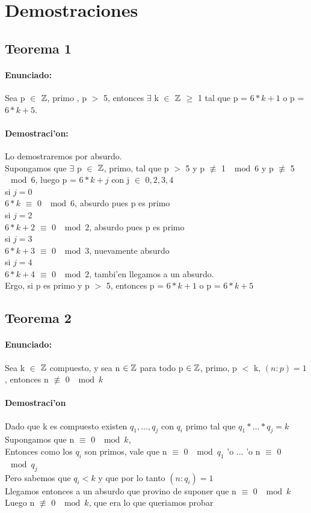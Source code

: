 \section{Demostraciones}
\subsection{Teorema 1}
\paragraph{Enunciado:}
Sea p $\in$ ${\mathbb Z}$, primo , p $>$ 5, entonces $\exists$ k $\in$ ${\mathbb Z}$ $\geq$ 1  tal que p = $6*k+1$ o p = $6*k +5$.
\paragraph{Demostraci'on:}
Lo demostraremos por absurdo.\\ Supongamos que $\exists$ p $\in$ ${\mathbb Z}$, primo, tal que p $>$ 5 y p $\not\equiv$ 1  $\mod{6}$ y p
$\not\equiv$ 5  $\mod{6}$, luego p = $6*k + j$ con j $\in$ ${0,2,3,4}$ \\
si $j = 0$\\
$6*k$ $\equiv$ 0  $\mod{6}$, absurdo pues p es primo\\
si $j = 2$\\
$6*k + 2$ $\equiv$ 0  $\mod{2}$, absurdo pues p es primo \\
si $j = 3$\\
$6*k + 3$ $\equiv$ 0  $\mod{3}$, nuevamente absurdo\\
si $j = 4$\\
$6*k + 4$ $\equiv$ 0  $\mod{2}$, tambi'en llegamos a un absurdo.\\
Ergo, si p es primo y p $>$ 5, entonces p = $6*k+1$ o p = $6*k +5$

\subsection{Teorema 2}
\paragraph{Enunciado:}
Sea k $\in$ ${\mathbb Z}$ compuesto, y sea n ${\in {\mathbb Z}}$ para todo p ${\in {\mathbb Z}}$, primo, p $<$ k, $(n:p) = 1$, entonces n $\not\equiv$ 0 $\mod{k}$
\paragraph{Demostraci'on}
Dado que k es compuesto existen $q_1,\ldots,q_j$ con $q_i$ primo tal que $q_1*\ldots*q_j = k$ \\
Supongamos que n $\equiv$ 0 $\mod{k}$,\\
Entonces como los $q_i$ son primos, vale que n $\equiv$ 0 $\mod{q_1}$ 'o ... 'o n $\equiv$ 0 $\mod{q_j}$ \\
Pero sabemos que $q_i < k$ y que por lo tanto $(n:q_{i}) = 1$ \\
Llegamos entonces a un absurdo que provino de suponer que  n $\equiv$ 0 $\mod{k}$ \\ 
Luego n $\not\equiv$ 0 $\mod{k}$, que era lo que queriamos probar


